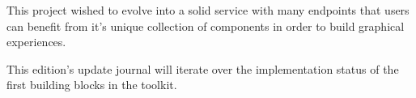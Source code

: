 







This project wished to evolve into a solid service with many endpoints that users can benefit from it's unique collection of components in order to build graphical experiences.



This edition's update journal will iterate over the implementation status of the first building blocks in the toolkit. 













